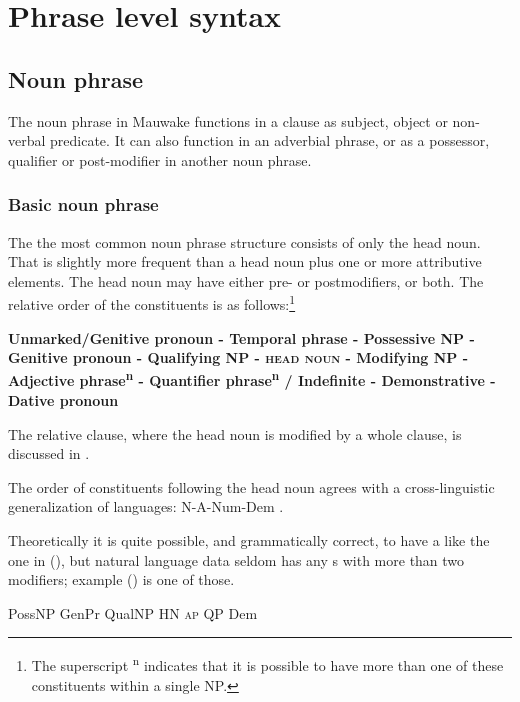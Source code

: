 
\chapter{Phrase level syntax}
{}
\section{Noun phrase}
{}
The noun phrase in Mauwake functions in a clause as subject, object or non-verbal predicate. It can also function in an adverbial phrase, or as a possessor, qualifier or post-modifier in another noun phrase.

\subsection{Basic noun phrase}
{}
The the most common noun phrase structure consists of only the head noun. That is slightly more frequent than a head noun plus one or more attributive elements. The head noun may have either pre- or postmodifiers, or both. The relative order of the  constituents is as follows:\footnote{The superscript \textsuperscript{n} indicates that it is possible to have more than one of these constituents within a single NP.}

{\bfseries
Unmarked/Genitive pronoun - Temporal phrase - Possessive NP - Genitive pronoun - Qualifying NP - \textsc{head} \textsc{noun} - Modifying NP - Adjective phrase\textsuperscript{n} - Quantifier phrase\textsuperscript{n} / Indefinite - Demonstrative - Dative pronoun}

The relative clause, where the head noun is modified by a whole clause, is discussed in .

The order of  constituents following the head noun agrees with a cross-linguistic generalization of  languages:  N-A-Num-Dem \citep[112]{Dryer2007a}.

Theoretically it is quite possible, and grammatically correct, to have a  like the one in (), but natural language data seldom has any s with more than two modifiers; example () is one of those.

\ea
PossNP  GenPr  QualNP  HN  \textsc{ap}  QP  Dem
\z

